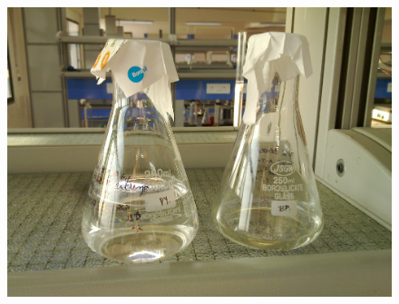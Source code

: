 	\begin{figure}[bth]
		\begin{center}
			\includegraphics[width=1.2\linewidth]{gfx/e4_3}
		\end{center}
	\caption[Pyridine on the Left, Benzophenone on the Right]{\label{e4_3}}
	\end{figure}
